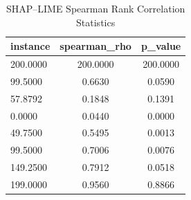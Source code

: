 \begin{table}
\centering
\caption{SHAP–LIME Spearman Rank Correlation Statistics}
\label{tab:agreement}
\begin{tabular}{lcc}
\toprule
instance & spearman_rho & p_value \\
\midrule
200.0000 & 200.0000 & 200.0000 \\
99.5000 & 0.6630 & 0.0590 \\
57.8792 & 0.1848 & 0.1391 \\
0.0000 & 0.0440 & 0.0000 \\
49.7500 & 0.5495 & 0.0013 \\
99.5000 & 0.7006 & 0.0076 \\
149.2500 & 0.7912 & 0.0518 \\
199.0000 & 0.9560 & 0.8866 \\
\bottomrule
\end{tabular}
\end{table}

